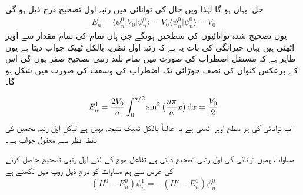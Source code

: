 حل: یہاں 
 ہو گا لہٰذا    ویں حال کی توانائی میں رتبہ اول تصحیح درج ذیل ہو گی
\begin{align*}
E_n^1 = \langle \psi_n^0 | V_0 | \psi_n^0 \rangle = V_0 \langle \psi_n^0 | \psi_n^0 \rangle = V_0
\end{align*}
یوں  تصحیح  شدہ توانائیوں کی سطحیں   ہونگے جی ہاں تمام کی تمام  مقدار سے اوپر  اٹھتی ہیں یہاں حیرانگی کی بات یہ ہے کہ رتبہ اول نظریہ بالکل ٹھیک جواب دیتا ہے یوں ظاہر ہے کہ مستقل اضطراب کی صورت میں تمام بلند رتبی تصحیح صفر ہوں گی  اس کے برعکس کنواں کی نصف چوڑائی تک اضطراب کی وسعت کی صورت میں شکل
 ہو گا۔

\begin{align*}
E_n^1 = \frac{2V_0}{a} \int_0^{a/2} \sin^2 \big(\frac{n \pi}{a} x\big ) \dif  x= \frac{V_0}{2}
\end{align*}
اب توانائی کی ہر سطح  
اوپر  اٹھتی ہے یہ غالباً بالکل ٹھیک نتیجہ نہیں ہے لیکن اول رتبہ تخمین کی نقطہ نظر سے معقول جواب ہے۔

 مساوات  ہمیں توانائی کی اول رتبی  تصحیح دیتی ہے تفاعل موج کے لئے اول رتبی تصحیح حاصل کرنے کی غرض سے ہم مساوات  کو درج ذیل روپ میں لکھتے ہے 
\begin{align}
(H^0 - E_n^0) \psi_n^1 = - (H' - E_n^1) \psi_n^0
\end{align}

